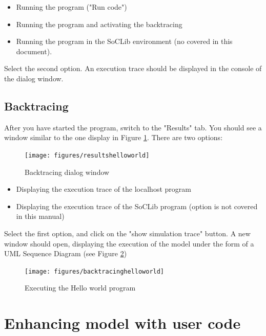 \documentclass[12pt]{article}
\begin{document}
\begin{itemize}
\item Running the program ("Run code")
\item Running the program and activating the backtracing
\item Running the program in the SoCLib environment (no covered in this document).
\end{itemize}
Select the second option. An execution trace should be displayed in the console of the dialog window.

\subsection{Backtracing}
After you have started the program, switch to the "Results" tab. You should see a window similar to the one display in Figure \ref{fig:resultshelloworld}. There are two options:
\begin{figure}[htbp]
\centering
\texttt{[image: figures/resultshelloworld]}
\caption{Backtracing dialog window} \label{fig:resultshelloworld}
\end{figure}
\begin{itemize}
\item Displaying the execution trace of the localhost program
\item Displaying the execution trace of the SoCLib program (option is not covered in this manual)
\end{itemize}
Select the first option, and click on the "show simulation trace" button. A new window should open, displaying the execution of the model under the form of a UML Sequence Diagram (see Figure \ref{fig:backtracinghelloworld})

\begin{figure}[htbp]
\centering
\texttt{[image: figures/backtracinghelloworld]}
\caption{Executing the Hello world program} \label{fig:backtracinghelloworld}
\end{figure}

\newpage
\section{Enhancing model with user code}\label{sec:custom}
\end{document}
